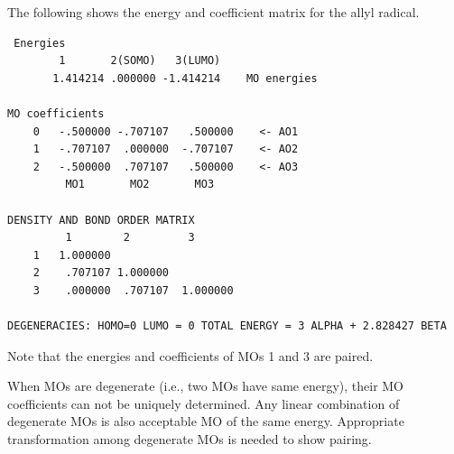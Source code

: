 \documentclass[../Main/chem532-notes.tex]{subfiles}
\begin{document}
\begin{example}
The following shows the energy and coefficient matrix for the allyl radical. 
\begin{verbatim}
 Energies
        1       2(SOMO)   3(LUMO) 
       1.414214 .000000 -1.414214    MO energies

MO coefficients
    0   -.500000 -.707107   .500000    <- AO1
    1   -.707107  .000000  -.707107    <- AO2
    2   -.500000  .707107   .500000    <- AO3
         MO1       MO2       MO3

DENSITY AND BOND ORDER MATRIX
         1        2         3 
    1   1.000000
    2    .707107 1.000000
    3    .000000  .707107  1.000000
         
DEGENERACIES: HOMO=0 LUMO = 0 TOTAL ENERGY = 3 ALPHA + 2.828427 BETA         
\end{verbatim}
Note that the energies and coefficients of MOs 1 and 3 are paired.
\end{example}

When MOs are degenerate (i.e., two MOs have same energy), their MO coefficients can not be uniquely determined.  Any linear combination of degenerate MOs is also acceptable MO of the same energy.  Appropriate transformation among degenerate MOs is needed to show pairing.
\end{document}
